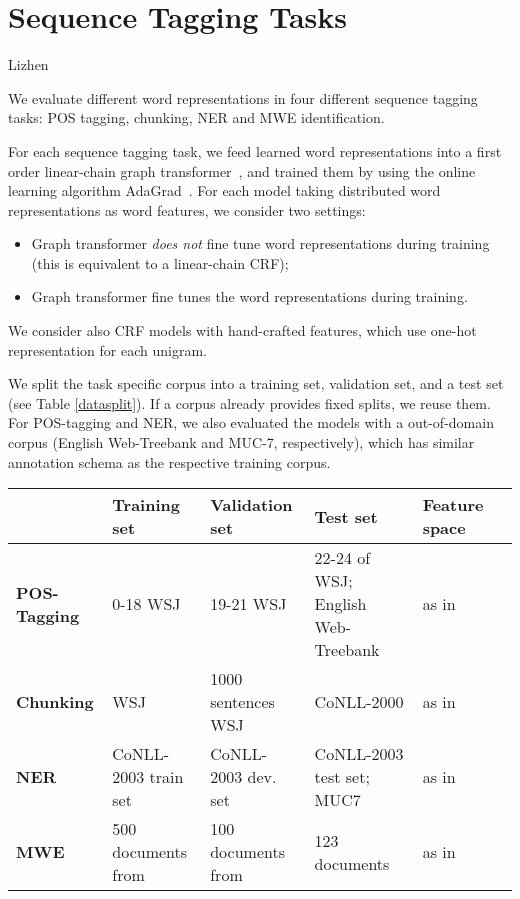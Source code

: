 \section{Sequence Tagging Tasks}
\label{sec:SeqTagging}

{\color{red}Lizhen}

We evaluate different word representations in four different sequence tagging tasks: POS tagging, chunking, NER and MWE identification. 

For each sequence tagging task, we feed learned word representations into a first order linear-chain graph
transformer~\cite{collobert2011natural}, and trained them by using the online learning algorithm
AdaGrad~\cite{duchi2011adaptive}.
For each model taking distributed word representations as word features, we consider two settings: 

\begin{small}
\begin{itemize}
\item[-] Graph transformer \textit{does not} fine tune word representations during training (this is equivalent to a linear-chain CRF);
\item[-] Graph transformer fine tunes the word representations during training.
\end{itemize}
\end{small}

We consider also CRF models with hand-crafted features, which use one-hot representation for each unigram.

We split the task specific corpus into a training set, validation set, and a test set (see Table \ref{datasplit}). If a corpus already provides fixed splits, we reuse them. For POS-tagging and NER, we also evaluated the models with a out-of-domain corpus (English Web-Treebank and MUC-7, respectively), which has similar annotation schema as the respective training corpus.

\begin{table*}
\caption{Datasets splits and feature space for each sequence tagging task.}
\begin{small}
\begin{tabular}{lllp{}ll}
\hline
			& \textbf{Training set} & \textbf{Validation set} & \textbf{Test set} & \textbf{Feature space} \\ \hline
\textbf{POS-Tagging} & 0-18 WSJ & 19-21 WSJ & 22-24 of WSJ; English Web-Treebank & as in~\cite{collobert2011natural} \\
\textbf{Chunking} & WSJ & 1000 sentences WSJ & CoNLL-2000 & as in~\cite{turian2010word}\\
\textbf{NER} & CoNLL-2003 train set & CoNLL-2003 dev. set & CoNLL-2003 test set; MUC7 & as in~\cite{turian2010word} \\
\textbf{MWE} & 500 documents from & 100 documents from & 123 documents & as in~\cite{mwecorpus}\\
\hline
\end{tabular}
\label{datasplit}
\end{small}
\end{table*}


